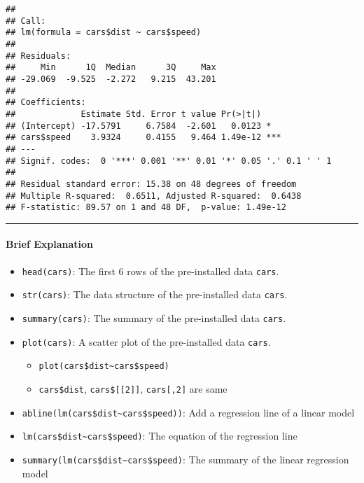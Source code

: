 \documentclass[
]{article}
\providecommand{\tightlist}{%
  \setlength{\itemsep}{0pt}\setlength{\parskip}{0pt}}
\begin{document}
\begin{verbatim}
## 
## Call:
## lm(formula = cars$dist ~ cars$speed)
## 
## Residuals:
##     Min      1Q  Median      3Q     Max 
## -29.069  -9.525  -2.272   9.215  43.201 
## 
## Coefficients:
##             Estimate Std. Error t value Pr(>|t|)    
## (Intercept) -17.5791     6.7584  -2.601   0.0123 *  
## cars$speed    3.9324     0.4155   9.464 1.49e-12 ***
## ---
## Signif. codes:  0 '***' 0.001 '**' 0.01 '*' 0.05 '.' 0.1 ' ' 1
## 
## Residual standard error: 15.38 on 48 degrees of freedom
## Multiple R-squared:  0.6511, Adjusted R-squared:  0.6438 
## F-statistic: 89.57 on 1 and 48 DF,  p-value: 1.49e-12
\end{verbatim}

\begin{center}\rule{0.5\linewidth}{0.5pt}\end{center}

\hypertarget{brief-explanation}{%
\paragraph{Brief Explanation}\label{brief-explanation}}

\begin{itemize}
\tightlist
\item
  \texttt{head(cars)}: The first 6 rows of the pre-installed data
  \texttt{cars}.
\item
  \texttt{str(cars)}: The data structure of the pre-installed data
  \texttt{cars}.
\item
  \texttt{summary(cars)}: The summary of the pre-installed data
  \texttt{cars}.
\item
  \texttt{plot(cars)}: A scatter plot of the pre-installed data
  \texttt{cars}.

  \begin{itemize}
  \tightlist
  \item
    \texttt{plot(cars\$dist\textasciitilde{}cars\$speed)}
  \item
    \texttt{cars\$dist}, \texttt{cars\${[}{[}2{]}{]}},
    \texttt{cars{[},2{]}} are same
  \end{itemize}
\item
  \texttt{abline(lm(cars\$dist\textasciitilde{}cars\$speed))}: Add a
  regression line of a linear model
\item
  \texttt{lm(cars\$dist\textasciitilde{}cars\$speed)}: The equation of
  the regression line
\item
  \texttt{summary(lm(cars\$dist\textasciitilde{}cars\$speed)}: The
  summary of the linear regression model
\end{itemize}
\end{document}
